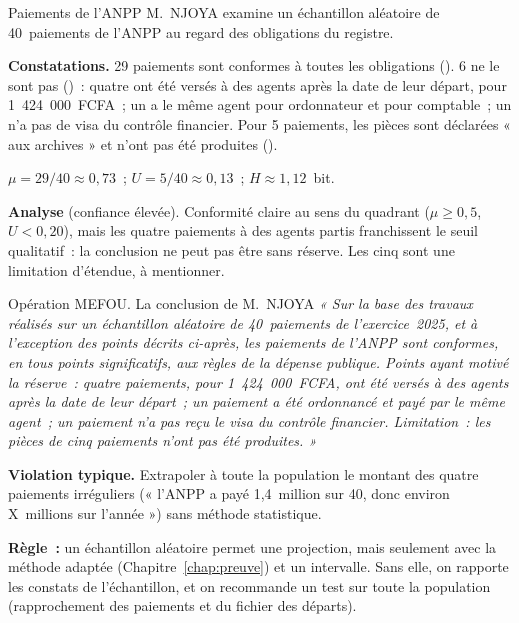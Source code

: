 \begin{boxlecture}{Paiements de l'ANPP}
M.~NJOYA examine un échantillon aléatoire de 40~paiements de l'ANPP au
regard des obligations du registre.

\medskip
\textbf{Constatations.} 29 paiements sont conformes à toutes les
obligations (\OUI{}). 6 ne le sont pas (\NON{})~: quatre ont été versés à
des agents après la date de leur départ, pour 1~424~000~FCFA~; un a le même
agent pour ordonnateur et pour comptable~; un n'a pas de visa du contrôle
financier. Pour 5 paiements, les pièces sont déclarées « aux archives » et
n'ont pas été produites (\NEK{}).

\medskip
$\mu = 29/40 \approx 0{,}73$~; $U = 5/40 \approx 0{,}13$~; $H \approx
1{,}12$~bit.

\medskip
\textbf{Analyse} (confiance élevée). Conformité claire au sens du quadrant
($\mu \ge 0{,}5$, $U < 0{,}20$), mais les quatre paiements à des agents
partis franchissent le seuil qualitatif~: la conclusion ne peut pas être
sans réserve. Les cinq \NEK{} sont une limitation d'étendue, à mentionner.

\medskip
\hfill{}
\end{boxlecture}

\begin{boxscenario}{Opération MEFOU. La conclusion de M.~NJOYA}
\textit{« Sur la base des travaux réalisés sur un échantillon aléatoire de
40~paiements de l'exercice~2025, et à l'exception des points décrits
ci-après, les paiements de l'ANPP sont conformes, en tous points
significatifs, aux règles de la dépense publique. Points ayant motivé la
réserve~: quatre paiements, pour 1~424~000~FCFA, ont été versés à des agents
après la date de leur départ~; un paiement a été ordonnancé et payé par le
même agent~; un paiement n'a pas reçu le visa du contrôle financier.
Limitation~: les pièces de cinq paiements n'ont pas été produites. »}
\end{boxscenario}

\begin{boxalert}
\textbf{Violation typique.} Extrapoler à toute la population le montant des
quatre paiements irréguliers (« l'ANPP a payé 1,4~million sur 40, donc
environ X~millions sur l'année ») sans méthode statistique.

\smallskip
\textbf{Règle~:} un échantillon aléatoire permet une projection, mais
seulement avec la méthode adaptée (Chapitre~\ref{chap:preuve}) et un
intervalle. Sans elle, on rapporte les constats de l'échantillon, et on
recommande un test sur toute la population (rapprochement des paiements et
du fichier des départs).
\end{boxalert}

